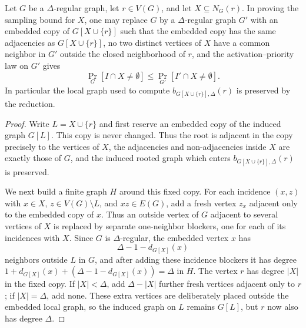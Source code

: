 \begin{lemma}
Let $G$ be a $\Delta$-regular graph, let $r\in V(G)$, and let
$X\subseteq N_G(r)$.  In proving the sampling bound for $X$, one may replace
$G$ by a $\Delta$-regular graph $G'$ with an embedded copy of
$G[X\cup\{r\}]$ such that the embedded copy has the same adjacencies as
$G[X\cup\{r\}]$, no two distinct vertices of $X$ have a common neighbor in
$G'$ outside the closed neighborhood of $r$, and the activation--priority
law on $G'$ gives
\[
\Pr_G[I\cap X\ne\emptyset]\le
\Pr_{G'}[I'\cap X\ne\emptyset].
\]
In particular the local graph used to compute
$b_{G[X\cup\{r\}],\Delta}(r)$ is preserved by the reduction.
\end{lemma}
\begin{proof}
Write $L=X\cup\{r\}$ and first reserve an embedded copy of the induced graph
$G[L]$.  This copy is never changed.  Thus the root is adjacent in the copy
precisely to the vertices of $X$, the adjacencies and non-adjacencies inside
$X$ are exactly those of $G$, and the induced rooted graph which enters
$b_{G[X\cup\{r\}],\Delta}(r)$ is preserved.

We next build a finite graph $H$ around this fixed copy.  For each incidence
$(x,z)$ with $x\in X$, $z\in V(G)\setminus L$, and $xz\in E(G)$, add a fresh
vertex $z_x$ adjacent only to the embedded copy of $x$.  Thus an outside
vertex of $G$ adjacent to several vertices of $X$ is replaced by separate
one-neighbor blockers, one for each of its incidences with $X$.  Since $G$ is
$\Delta$-regular, the embedded vertex $x$ has
\[
\Delta-1-d_{G[X]}(x)
\]
neighbors outside $L$ in $G$, and after adding these incidence blockers it
has degree
$1+d_{G[X]}(x)+(\Delta-1-d_{G[X]}(x))=\Delta$ in $H$.  The vertex $r$ has
degree $|X|$ in the fixed copy.  If $|X|<\Delta$, add
$\Delta-|X|$ further fresh vertices adjacent only to $r$; if $|X|=\Delta$,
add none.  These extra vertices are deliberately placed outside the embedded
local graph, so the induced graph on $L$ remains $G[L]$, but $r$ now also has
degree $\Delta$.


\end{proof}

